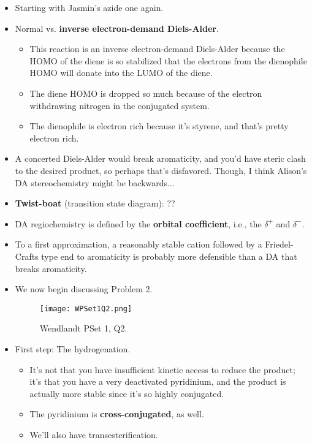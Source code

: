 \documentclass[../notes.tex]{subfiles}
\begin{document}
\begin{itemize}
    \item {}Starting with Jasmin's azide one again.
    \item Normal vs. \textbf{inverse electron-demand Diels-Alder}.
    \begin{itemize}
        \item This reaction is an inverse electron-demand Diels-Alder because the HOMO of the diene is so stabilized that the electrons from the dienophile HOMO will donate into the LUMO of the diene.
        \item The diene HOMO is dropped so much because of the electron withdrawing nitrogen in the conjugated system.
        \item The dienophile is electron rich because it's styrene, and that's pretty electron rich.
    \end{itemize}
    \item A concerted Diels-Alder would break aromaticity, and you'd have steric clash to the desired product, so perhaps that's disfavored. Though, I think Alison's DA stereochemistry might be backwards...
    \item \textbf{Twist-boat} (transition state diagram): ??
    \item DA regiochemistry is defined by the \textbf{orbital coefficient}, i.e., the $\delta^+$ and $\delta^-$.
    \item To a first approximation, a reasonably stable cation followed by a Friedel-Crafts type end to aromaticity is probably more defensible than a DA that breaks aromaticity.
    \item We now begin discussing Problem 2.
    \begin{figure}[h!]
        \centering
        \texttt{[image: WPSet1Q2.png]}
        \caption{Wendlandt PSet 1, Q2.}
        \label{fig:WPSet1Q2}
    \end{figure}
    \item First step: The hydrogenation.
    \begin{itemize}
        \item It's not that you have insufficient kinetic access to reduce the product; it's that you have a very deactivated pyridinium, and the product is actually more stable since it's so highly conjugated.
        \item The pyridinium is \textbf{cross-conjugated}, as well.
        \item We'll also have transesterification.
    \end{itemize}

\end{itemize}
\end{document}
